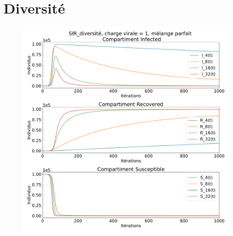 \chapter{Diversité} \label{ch:DIV}

\begin{figure}[h]
	\centering
	\captionsetup{justification=centering}
	\includegraphics[width=.7\textwidth]{Images/SIR_diversite_mix.pdf}
\end{figure}

\newpage

